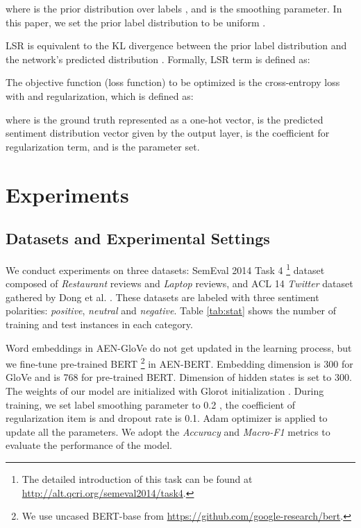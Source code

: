\documentclass[11pt,a4paper]{article}
\begin{document}
where  is the prior distribution over labels ,
and  is the smoothing parameter.
In this paper, we set the prior label distribution to be uniform .

LSR is equivalent to the KL divergence between the prior label distribution  and the network's predicted distribution .
Formally, LSR term is defined as:


The objective function (loss function) to be optimized is the cross-entropy loss with  and  regularization, which is defined as:


where  is the ground truth represented as a one-hot vector,
 is the predicted sentiment distribution vector given by the output layer,
 is the coefficient for  regularization term, and  is the parameter set.




\section{Experiments}

\subsection{Datasets and Experimental Settings}

We conduct experiments on three datasets: SemEval 2014 Task 4 \footnote{The detailed introduction of this task can be found at \url{http://alt.qcri.org/semeval2014/task4}.} \cite{pontiki2014semeval} dataset composed of \emph{Restaurant} reviews and \emph{Laptop} reviews, and ACL 14 \emph{Twitter} dataset gathered by Dong et al. . These datasets are labeled with three sentiment polarities: \emph{positive}, \emph{neutral} and \emph{negative}.
Table \ref{tab:stat} shows the number of training and test instances in each category.

Word embeddings in AEN-GloVe do not get updated in the learning process,
but we fine-tune pre-trained BERT
\footnote{We use uncased BERT-base from \url{https://github.com/google-research/bert}.} in AEN-BERT.
Embedding dimension  is 300 for GloVe and is 768 for pre-trained BERT.
Dimension of hidden states  is set to 300.
The weights of our model are initialized with Glorot initialization \cite{glorot2010understanding}.
During training, we set label smoothing parameter  to 0.2 \cite{szegedy2016rethinking}, the coefficient  of  regularization item is  and dropout rate is 0.1.
Adam optimizer \cite{kingma2014adam} is applied to update all the parameters.
We adopt the \emph{Accuracy} and \emph{Macro-F1} metrics to evaluate the performance of the model.
\end{document}
